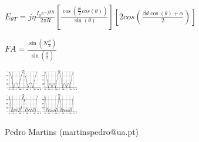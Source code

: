 \documentclass[10pt,landscape]{article}
\begin{document}
\begin{multicols}{4}
$E_{\theta T} = j\eta \frac{I_0e^{-j\beta R}}{2\pi R} \left[\frac{\cos\left(\frac{pi}{2}cos(\theta)\right)}{\sin(\theta)}\right]\left[2cos\left(\frac{\beta d \cos(\theta) + \alpha}{2}\right)\right]$

$FA = \frac{\sin(N\frac{\phi}{2})}{\sin(\frac{\phi}{2})}$


\includegraphics[width=0.25\textwidth]{radiation_diagram.png}



{\scriptsize \raggedleft  Pedro Martins (martinspedro@ua.pt)}

\end{multicols}
\end{document}
